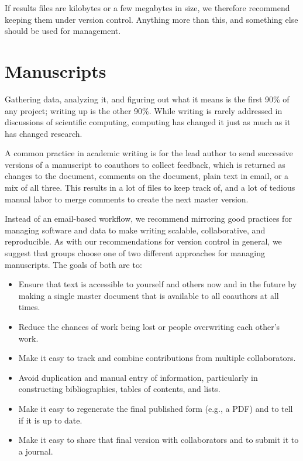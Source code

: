 \documentclass[10pt]{article}
\begin{document}
If results files are kilobytes or a few megabytes in size, we
therefore recommend keeping them under version control. Anything more
than this, and something else should be used for management.

\section{Manuscripts}\label{sec:manuscripts}

Gathering data, analyzing it, and figuring out what it means is the
first 90\% of any project; writing up is the other 90\%. While writing
is rarely addressed in discussions of scientific computing, computing
has changed it just as much as it has changed research.

A common practice in academic writing is for the lead author to send
successive versions of a manuscript to coauthors to collect feedback,
which is returned as changes to the document, comments on the
document, plain text in email, or a mix of all three. This results in
a lot of files to keep track of, and a lot of tedious manual labor to
merge comments to create the next master version.

Instead of an email-based workflow, we recommend mirroring good
practices for managing software and data to make writing scalable,
collaborative, and reproducible.  As with our recommendations for
version control in general, we suggest that groups choose one of two
different approaches for managing manuscripts.  The goals of both are
to:

\begin{itemize}
\item
  Ensure that text is accessible to yourself and others now and in the
  future by making a single master document that is available to all
  coauthors at all times.
\item
  Reduce the chances of work being lost or people overwriting each
  other's work.
\item
  Make it easy to track and combine contributions from multiple
  collaborators.
\item
  Avoid duplication and manual entry of information, particularly in
  constructing bibliographies, tables of contents, and lists.
\item
  Make it easy to regenerate the final published form (e.g., a PDF) and
  to tell if it is up to date.
\item
  Make it easy to share that final version with collaborators and to
  submit it to a journal.
\end{itemize}
\end{document}
